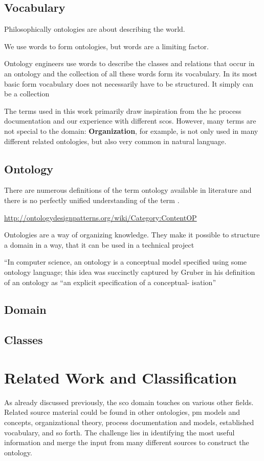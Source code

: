 \documentclass[a4paper, DIV=13, BCOR=0cm]{scrbook}
\begin{document}
\subsection{Vocabulary  }
Philosophically ontologies are about describing the world.

We use words to form ontologies, but words are a limiting factor.

Ontology engineers use words to describe the classes and relations that occur in an ontology and the collection of all these words form its vocabulary. In its most basic form vocabulary does not necessarily have to be structured. It simply can be a collection 

The terms used in this work primarily draw inspiration from the \gls{hc} process documentation and our experience with different \glspl{sco}. However, many terms are not special to the domain: \textbf{Organization}, for example, is not only used in many different related ontologies, but also very common in natural language.


\subsection{Ontology}
There are numerous definitions of the term ontology available in literature \cite[p.\,4, section 1.1.2.1]{loebe2015ontological} and there is no perfectly unified understanding of the term \cite{Hesse_2014}.

\url{http://ontologydesignpatterns.org/wiki/Category:ContentOP}

Ontologies are a way of organizing knowledge. They make it possible to structure a domain in a way, that it can be used in a technical project 

\enquote{In computer science, an ontology is a conceptual model specified using some ontology language; this idea was succinctly captured by Gruber in his definition of an ontology as “an explicit specification of a conceptual- isation} \cite{baader2017introduction}

\subsection{Domain}
\subsection{Classes}

\section{Related Work and Classification}
\label{related-work}
As already discussed previously, the \gls{sco} domain touches on various other fields. Related source material could be found in other ontologies, \gls{pm} models and concepts, organizational theory, process documentation and models, established vocabulary, and so forth. The challenge lies in identifying the most useful information and merge the input from many different sources to construct the ontology.
\end{document}

